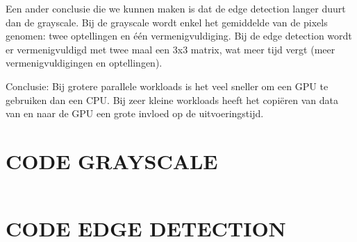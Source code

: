 \documentclass[11pt,twoside,a4paper]{article}
\begin{document}
Een ander conclusie die we kunnen maken is dat de edge detection langer duurt dan de grayscale. Bij de grayscale wordt enkel het gemiddelde van de pixels genomen: twee optellingen en \'e\'en vermenigvuldiging. Bij de edge detection wordt er vermenigvuldigd met twee maal een 3x3 matrix, wat meer tijd vergt (meer vermenigvuldigingen en optellingen).

Conclusie: Bij grotere parallele workloads is het veel sneller om een GPU te gebruiken dan een CPU. Bij zeer kleine workloads heeft het copi\"eren van data van en naar de GPU een grote invloed op de uitvoeringstijd.


\newpage
\appendix


\section{CODE GRAYSCALE}\label{code_grayscale}
\inputminted[linenos=true, breaklines=true]{cuda}{main.cu}
\clearpage
\section{CODE EDGE DETECTION}\label{code_edge_detection}
\inputminted[linenos=true, breaklines=true]{cuda}{edge.cu}

\clearpage



\end{document}
